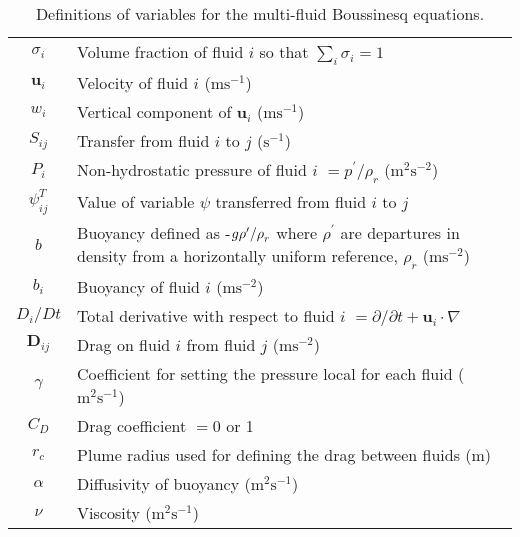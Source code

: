 \documentclass[draft]{agujournal2019}
\begin{document}
\begin{table}[ht]
\begin{tabular}{c>{\raggedright}p{}}
$\sigma_{i}$ & Volume fraction of fluid $i$ so that $\sum_{i}\sigma_{i}=1$\tabularnewline
$\mathbf{u}_{i}$ & Velocity of fluid $i$ ($\text{m}\text{s}^{-1}$)\tabularnewline
$w_{i}$ & Vertical component of $\mathbf{u}_{i}$ ($\text{m}\text{s}^{-1}$)\tabularnewline
$S_{ij}$ & Transfer from fluid $i$ to $j$ ($\text{s}^{-1}$)\tabularnewline
$P_{i}$ & Non-hydrostatic pressure of fluid $i$ $=p^{\prime}/\rho_{r}$ ($\text{m}^{2}\text{s}^{-2}$)\tabularnewline
$\psi_{ij}^{T}$ & Value of variable $\psi$ transferred from fluid $i$ to $j$\tabularnewline
$b$ & Buoyancy defined as -$g\rho^{\prime}/\text{\ensuremath{\rho}}_{r}$
where $\rho^{\prime}$ are departures in density from a horizontally
uniform reference, $\rho_{r}$ ($\text{m}\text{s}^{-2}$)\tabularnewline
$b_{i}$ & Buoyancy of fluid $i$ ($\text{m}\text{s}^{-2}$)\tabularnewline
$D_{i}\big/Dt$ & Total derivative with respect to fluid $i$ $=\partial/\partial t+\mathbf{u}_{i}\cdot\nabla$\tabularnewline
$\mathbf{D}_{ij}$ & Drag on fluid $i$ from fluid $j$ ($\text{m}\text{s}^{-2}$)\tabularnewline
$\gamma$ & Coefficient for setting the pressure local for each fluid ($\text{m}^{2}\text{s}^{-1}$)\tabularnewline
$C_{D}$ & Drag coefficient $=0$ or 1\tabularnewline
$r_{c}$ & Plume radius used for defining the drag between fluids (m)\tabularnewline
$\alpha$ & Diffusivity of buoyancy ($\text{m}^{2}\text{s}^{-1}$)\tabularnewline
$\nu$ & Viscosity ($\text{m}^{2}\text{s}^{-1}$)\tabularnewline
\end{tabular}
\caption{Definitions of variables for the multi-fluid Boussinesq equations.\label{tab:defns}}
\end{table}
\end{document}
